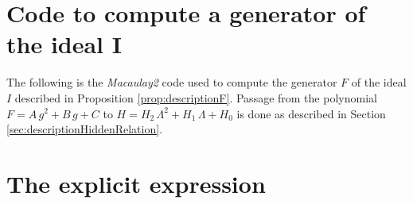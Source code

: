 \documentclass[phd,tocprelim]{cornell}
\begin{document}
\section{Code to compute a generator of the ideal I}

The following is the \textit{Macaulay2} code used to compute the generator $F$ of the ideal $I$ described in Proposition \ref{prop:descriptionF}. Passage from the polynomial $F=A\,g^2+B\,g+C$ to $H=H_2\,\Lambda^2+H_1\,\Lambda+H_0$ is done as described in Section \ref{sec:descriptionHiddenRelation}. 

\bigskip



\section{The explicit expression}











% 
\end{document}
